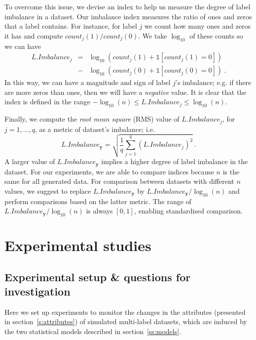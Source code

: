 \documentclass[review]{elsarticle}
\begin{document}
To overcome this issue, we devise an index to help us measure the degree of label imbalance in a dataset. Our imbalance index measures the ratio of ones and zeros that a label contains. For instance, for label $j$ we count how many ones and zeros it has and compute $count_{j}(1)/count_{j}(0)$. We take $\log_{10}$ of these counts so we can have
\begin{eqnarray} \nonumber
L.Imbalance_{j} &=& \log_{10}(count_{j}(1) + \mathds{1}[count_{j}(1) = 0]) \\  &-& \log_{10}(count_{j}(0) + \mathds{1}[count_{j}(0) = 0])\ .
\end{eqnarray}
In this way, we can have a magnitude and sign of label $j$'s imbalance; e.g. if there are more zeros than ones, then we will have a \emph{negative} value. It is clear that the index is defined in the range $-\log_{10}(n) \leq L.Imbalance_{j} \leq \log_{10}(n)$. 

Finally, we compute the \emph{root mean square} (RMS) value of $L.Imbalance_{j}$, for $j=1,\ldots,q$, as a metric of dataset's imbalance; i.e.
\begin{equation}\label{LIMB}
L.Imbalance_{\mathbf{y}} = \sqrt{\frac{1}{q} \sum^{q}_{j=1}{\left( L.Imbalance_{j} \right)^{2} }}\ .
\end{equation}
A larger value of $L.Imbalance_{\mathbf{y}}$ implies a higher degree of label imbalance in the dataset. For our experiments, we are able to compare indices because $n$ is the same for all generated data. For comparison between datasets with different $n$ values, we suggest to replace $L.Imbalance_{\mathbf{y}}$ by $L.Imbalance_{\mathbf{y}}/\log_{10}(n)$ and perform comparisons based on the latter metric. The range of $L.Imbalance_{\mathbf{y}}/\log_{10}(n)$ is always $[0,1]$, enabling standardised comparison.


\section{Experimental studies}

\subsection{Experimental setup \& questions for investigation}
\label{DEXPER} 

Here we set up experiments to monitor the changes in the attributes (presented in section~\ref{s:attributes}) of simulated multi-label datasets, which are induced by the two statistical models described in section~\ref{ss:models}.
\end{document}
